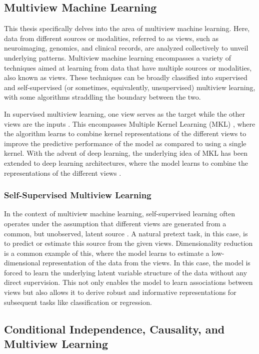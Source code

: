 \subsection{Multiview Machine Learning}
This thesis specifically delves into the area of multiview machine learning.
Here, data from different sources or modalities, referred to as \gls{views}, such as neuroimaging, genomics, and clinical records, are analyzed collectively to unveil underlying patterns.
Multiview machine learning encompasses a variety of techniques aimed at learning from data that have multiple sources or modalities, also known as \gls{views}.
These techniques can be broadly classified into supervised and self-supervised (or sometimes, equivalently, unsupervised) multiview learning, with some algorithms straddling the boundary between the two.

In supervised multiview learning, one view serves as the target while the other views are the inputs \citep{zong2023self}.
This encompasses Multiple Kernel Learning (MKL) \citep{gonen2011multiple}, where the algorithm learns to combine kernel representations of the different views to improve the predictive performance of the model as compared to using a single kernel.
With the advent of deep learning, the underlying idea of MKL has been extended to deep learning architectures, where the model learns to combine the representations of the different views \citep{guo2019deep}.

\subsubsection{Self-Supervised Multiview Learning}

In the context of multiview machine learning, self-supervised learning often operates under the assumption that different \gls{views} are generated from a common, but unobserved, latent source \citep{zong2023self}.
A natural pretext task, in this case, is to predict or estimate this source from the given \gls{views}.
Dimensionality reduction is a common example of this, where the model learns to estimate a low-dimensional representation of the data from the \gls{views}.
In this case, the model is forced to learn the underlying latent variable structure of the data without any direct supervision.
This not only enables the model to learn associations between \gls{views} but also allows it to derive robust and informative representations for subsequent tasks like classification or regression.

\subsection{Conditional Independence, Causality, and Multiview Learning}


